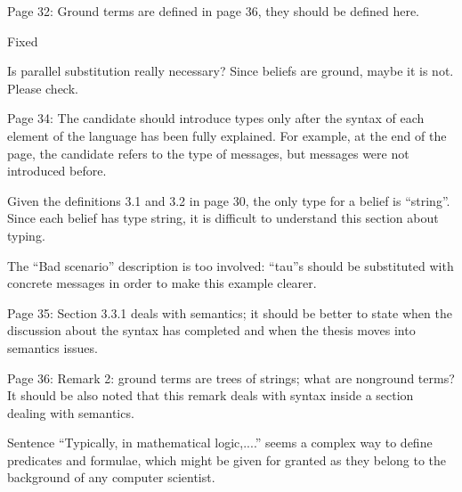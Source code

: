 \documentclass{article}
\newcommand{\todo}[1]{[\textcolor{red}{TODO}: #1]}
\newenvironment{them}{\noindent\begingroup\color{blue}}{\endgroup\par}
\begin{document}
\begin{them}

Page 32:
Ground terms are defined in page 36, they should be defined here.
\end{them}
Fixed

\begin{them}

Is parallel substitution really necessary? Since beliefs are ground, maybe it is not. Please check.
\end{them}
\todo{}

\begin{them}

Page 34:
The candidate should introduce types only after the syntax of each element of the language has been fully explained. For example, at the end of the page, the candidate refers to the type of messages, but messages were not introduced before.
\end{them}
\todo{}

\begin{them}

Given the definitions 3.1 and 3.2 in page 30, the only type for a belief is “string”. Since each belief has type string, it is difficult to understand this section about typing.
\end{them}
\todo{clarify}

\begin{them}

The “Bad scenario” description is too involved: “tau”s should be substituted with concrete messages in order to make this example clearer.
\end{them}
\todo{}

\begin{them}

Page 35:
Section 3.3.1 deals with semantics; it should be better to state when the discussion about the syntax has completed and when the thesis moves into semantics issues.
\end{them}
\todo{?}

\begin{them}

Page 36:
Remark 2: ground terms are trees of strings; what are nonground terms? It should be also noted that this remark deals with syntax inside a section dealing with semantics.
\end{them}
\todo{?}

\begin{them}

Sentence “Typically, in mathematical logic,....” seems a complex way to define predicates and
formulae, which might be given for granted as they belong to the background of any computer
scientist.
\end{them}
\todo{?}
\end{document}
